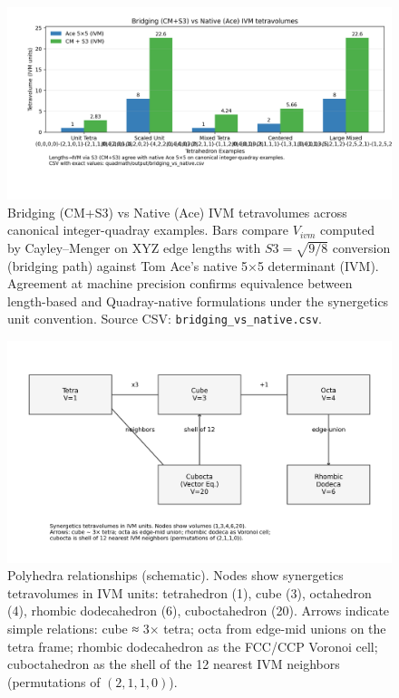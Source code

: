 \documentclass[
]{article}
\begin{document}
\begin{figure}
\hypertarget{fig:bridging_native}{%
\centering
\includegraphics{../output/figures/bridging_vs_native.png}
\caption{Bridging (CM+S3) vs Native (Ace) IVM tetravolumes across
canonical integer-quadray examples. Bars compare \(V_{ivm}\) computed by
Cayley--Menger on XYZ edge lengths with \(S3=\sqrt{9/8}\) conversion
(bridging path) against Tom Ace's native 5×5 determinant (IVM).
Agreement at machine precision confirms equivalence between length-based
and Quadray-native formulations under the synergetics unit convention.
Source CSV:
\texttt{bridging\_vs\_native.csv}.}\label{fig:bridging_native}
}
\end{figure}

\begin{figure}
\hypertarget{fig:polyhedra_quadray_map}{%
\centering
\includegraphics{../output/figures/polyhedra_quadray_constructions.png}
\caption{Polyhedra relationships (schematic). Nodes show synergetics
tetravolumes in IVM units: tetrahedron (1), cube (3), octahedron (4),
rhombic dodecahedron (6), cuboctahedron (20). Arrows indicate simple
relations: cube ≈ 3× tetra; octa from edge-mid unions on the tetra
frame; rhombic dodecahedron as the FCC/CCP Voronoi cell; cuboctahedron
as the shell of the 12 nearest IVM neighbors (permutations of
\((2,1,1,0)\)).}\label{fig:polyhedra_quadray_map}
}
\end{figure}
\end{document}
